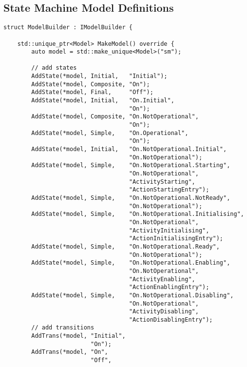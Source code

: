 \clearpage
\subsection{State Machine Model Definitions\label{annex:impl_basic_sm}}

\begin{lstlisting}[language=CXX, label={lst:annex_basic_model}, caption={Basic life cycle without omissions.}]
struct ModelBuilder : IModelBuilder {

    std::unique_ptr<Model> MakeModel() override {
        auto model = std::make_unique<Model>("sm");

        // add states
        AddState(*model, Initial,   "Initial");
        AddState(*model, Composite, "On");
        AddState(*model, Final,     "Off");
        AddState(*model, Initial,   "On.Initial",
                                    "On");
        AddState(*model, Composite, "On.NotOperational",
                                    "On");
        AddState(*model, Simple,    "On.Operational",
                                    "On");
        AddState(*model, Initial,   "On.NotOperational.Initial",
                                    "On.NotOperational");
        AddState(*model, Simple,    "On.NotOperational.Starting",
                                    "On.NotOperational",
                                    "ActivityStarting",
                                    "ActionStartingEntry");
        AddState(*model, Simple,    "On.NotOperational.NotReady",
                                    "On.NotOperational");
        AddState(*model, Simple,    "On.NotOperational.Initialising",
                                    "On.NotOperational",
                                    "ActivityInitialising",
                                    "ActionInitialisingEntry");
        AddState(*model, Simple,    "On.NotOperational.Ready",
                                    "On.NotOperational");
        AddState(*model, Simple,    "On.NotOperational.Enabling",
                                    "On.NotOperational",
                                    "ActivityEnabling",
                                    "ActionEnablingEntry");
        AddState(*model, Simple,    "On.NotOperational.Disabling",
                                    "On.NotOperational",
                                    "ActivityDisabling",
                                    "ActionDisablingEntry");
        // add transitions
        AddTrans(*model, "Initial",
                         "On");
        AddTrans(*model, "On",
                         "Off",

\end{lstlisting}
